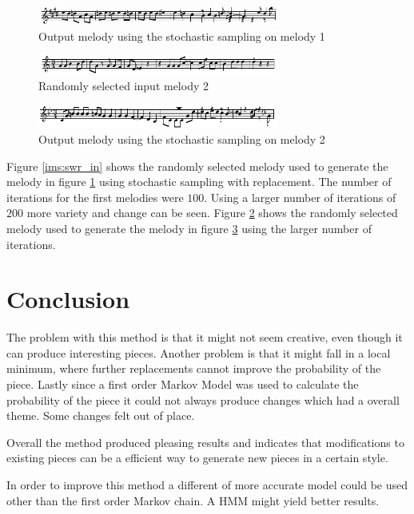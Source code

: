 \begin{figure}[h!]
\centerline{\includegraphics[width=300px]{../images/swr_out.pdf}}
\caption{Output melody using the stochastic sampling on melody 1}
\label{ims:swr_out}
\end{figure}

\begin{figure}[h!]
\centerline{\includegraphics[width=300px]{../images/swr_in2.pdf}}
\caption{Randomly selected input melody 2}
\label{ims:swr_in2}
\end{figure}

\begin{figure}[h!]
\centerline{\includegraphics[width=300px]{../images/swr_out2.pdf}}
\caption{Output melody using the stochastic sampling on melody 2}
\label{ims:swr_out2}
\end{figure}

Figure \ref{ims:swr_in} shows the randomly selected melody used to generate the melody in figure \ref{ims:swr_out} using stochastic sampling with replacement. The number of iterations for the first melodies were $100$.
Using a larger number of iterations of $200$ more variety and change can be seen. Figure \ref{ims:swr_in2} shows the randomly selected melody used to generate the melody in figure \ref{ims:swr_out2} using the larger number of iterations.


\section{Conclusion}
The problem with this method is that it might not seem creative, even though it can produce interesting pieces. Another problem is that it might fall in a local minimum, where further replacements cannot improve the probability of the piece. Lastly since a first order Markov Model was used to calculate the probability of the piece it could not always produce changes which had a overall theme. Some changes felt out of place.

Overall the method produced pleasing results and indicates that modifications to existing pieces can be a efficient way to generate new pieces in a certain style.

In order to improve this method a different of more accurate model could be used other than the first order Markov chain. A \ac{HMM} might yield better results.